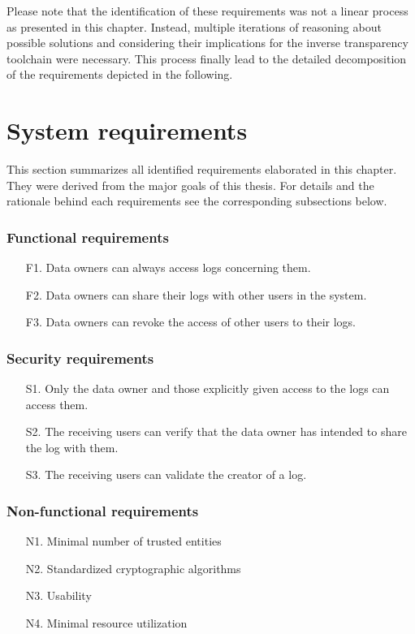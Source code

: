 \documentclass[../main.tex]{subfiles}
\begin{document}
Please note that the identification of these requirements was not a linear process as presented in this chapter.
Instead, multiple iterations of reasoning about possible solutions and considering their implications for the inverse transparency toolchain were necessary.
This process finally lead to the detailed decomposition of the requirements depicted in the following.



\section{System requirements}\label{system-requriements}
This section summarizes all identified requirements elaborated in this chapter.
They were derived from the major goals of this thesis.
For details and the rationale behind each requirements see the corresponding subsections below.

\subsubsection{Functional requirements}
\begin{itemize}
    \item [F1.] Data owners can always access logs concerning them.
    \item [F2.] Data owners can share their logs with other users in the system.
    \item [F3.] Data owners can revoke the access of other users to their logs.
\end{itemize}

\subsubsection{Security requirements}
\begin{itemize}
    \item [S1.] Only the data owner and those explicitly given access to the logs can access them.
    \item [S2.] The receiving users can verify that the data owner has intended to share the log with them.
    \item [S3.] The receiving users can validate the creator of a log.
\end{itemize}

\subsubsection{Non-functional requirements}
\begin{itemize}
    \item [N1.] Minimal number of trusted entities
    \item [N2.] Standardized cryptographic algorithms
    \item [N3.] Usability
    \item [N4.] Minimal resource utilization
\end{itemize}
\end{document}
